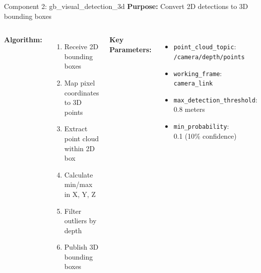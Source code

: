 \documentclass[aspectratio=169]{beamer}
\begin{document}
\begin{frame}{Component 2: gb\_visual\_detection\_3d}
\textbf{Purpose:} Convert 2D detections to 3D bounding boxes

\begin{columns}
\textbf{Algorithm:}
\begin{enumerate}
    \item Receive 2D bounding boxes
    \item Map pixel coordinates to 3D points
    \item Extract point cloud within 2D box
    \item Calculate min/max in X, Y, Z
    \item Filter outliers by depth
    \item Publish 3D bounding boxes
\end{enumerate}

\textbf{Key Parameters:}
\begin{itemize}
    \item \texttt{point\_cloud\_topic}:\\
    \texttt{/camera/depth/points}
    \item \texttt{working\_frame}:\\
    \texttt{camera\_link}
    \item \texttt{max\_detection\_threshold}:\\
    0.8 meters
    \item \texttt{min\_probability}:\\
    0.1 (10\% confidence)
\end{itemize}
\end{columns}
\end{frame}
\end{document}
